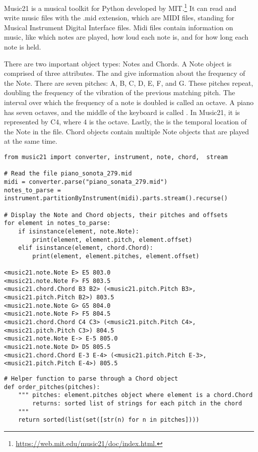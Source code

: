 Music21 is a musical toolkit for Python developed by MIT.\footnote{\url{https://web.mit.edu/music21/doc/index.html.}}
It can read and write music files with the .mid extension, which are MIDI files, standing for Musical Instrument Digital Interface files.
Midi files contain information on music, like which notes are played, how loud each note is, and for how long each note is held.

There are two important object types: Notes and Chords.
A Note object is comprised of three attributes.
The  and  give information about the frequency of the Note.
There are seven pitches: A, B, C, D, E, F, and G.
These pitches repeat, doubling the frequency of the vibration of the previous matching pitch.
The interval over which the frequency of a note is doubled is called an octave.
A piano has seven octaves, and the middle of the keyboard is called .
In Music21, it is represented by C$4$, where $4$ is the octave.
Lastly, the  is the temporal location of the Note in the file.
Chord objects contain multiple Note objects that are played at the same time.


\begin{lstlisting}
from music21 import converter, instrument, note, chord,  stream

# Read the file piano_sonota_279.mid
midi = converter.parse("piano_sonata_279.mid")
notes_to_parse = instrument.partitionByInstrument(midi).parts.stream().recurse()

# Display the Note and Chord objects, their pitches and offsets
for element in notes_to_parse:
	if isinstance(element, note.Note):
		print(element, element.pitch, element.offset)
	elif isinstance(element, chord.Chord):
		print(element, element.pitches, element.offset)

<music21.note.Note E> E5 803.0
<music21.note.Note F> F5 803.5
<music21.chord.Chord B3 B2> (<music21.pitch.Pitch B3>, <music21.pitch.Pitch B2>) 803.5
<music21.note.Note G> G5 804.0
<music21.note.Note F> F5 804.5
<music21.chord.Chord C4 C3> (<music21.pitch.Pitch C4>, <music21.pitch.Pitch C3>) 804.5
<music21.note.Note E-> E-5 805.0
<music21.note.Note D> D5 805.5
<music21.chord.Chord E-3 E-4> (<music21.pitch.Pitch E-3>, <music21.pitch.Pitch E-4>) 805.5

\end{lstlisting}

\begin{lstlisting}
# Helper function to parse through a Chord object
def order_pitches(pitches):
    """ pitches: element.pitches object where element is a chord.Chord
        returns: sorted list of strings for each pitch in the chord
    """
    return sorted(list(set([str(n) for n in pitches])))
\end{lstlisting}

